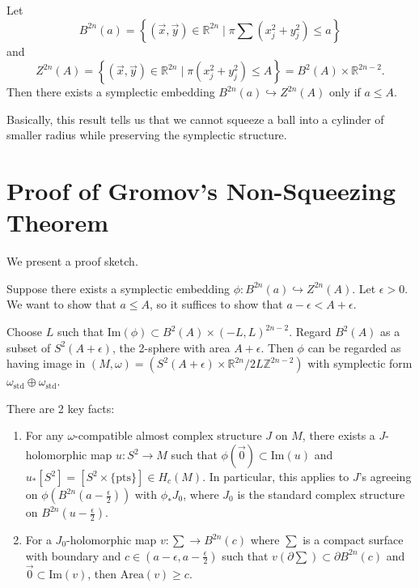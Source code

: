 \begin{theorem}

Let
\[
B^{2n}(a) = \left\{ (\vec{x}, \vec{y}) \in \mathbb{R}^{2n} \mid  \pi \sum (x_j^2+y_j^2) \le a\right\}
\]
and
\[
Z^{2n}(A) = \left\{ (\vec{x}, \vec{y}) \in \mathbb{R}^{2n} \mid  \pi(x_j^2+y_j^2) \le A \right\}=B^2(A) \times \mathbb{R}^{2n-2}.
\]
Then there exists a symplectic embedding $B^{2n}(a) \hookrightarrow Z^{2n}(A)$ only if $a\le A$.

\end{theorem}

Basically, this result tells us that we cannot squeeze a ball into a cylinder of smaller radius while preserving the symplectic structure.

\section{Proof of Gromov's Non-Squeezing Theorem}

We present a proof sketch.

Suppose there exists a symplectic embedding $\phi: B^{2n}(a) \hookrightarrow Z^{2n}(A)$. Let $\epsilon >0$. We want to show that $a\le A$, so it suffices to show that $a-\epsilon < A+\epsilon$.

Choose $L$ such that $\text{Im}(\phi) \subset B^2(A)\times (-L,L)^{2n-2}$. Regard $B^2(A)$ as a subset of $S^2(A+\epsilon)$, the 2-sphere with area $A+\epsilon$. Then $\phi$ can be regarded as having image in $(M, \omega)=(S^2(A+\epsilon)\times \mathbb{R}^{2n}/2L\mathbb{Z}^{2n-2})$ with symplectic form $\omega_{\text{std}}\oplus \omega_{\text{std}}$.

There are 2 key facts:

\begin{enumerate}
\item For any $\omega$-compatible almost complex structure $J$ on $M$, there exists a $J$-holomorphic map $u:S^2 \to M$ such that $\phi\left(\vec{0}\right)\subset \text{Im}(u)$ and $u_*[S^2]=[S^2\times \{\text{pts}\}] \in H_c(M)$. In particular, this applies to $J$'s agreeing on $\phi(B^{2n}(a-\frac{\epsilon}{2}))$ with $\phi_*J_0$, where $J_0$ is the standard complex structure on $B^{2n}(u-\frac{\epsilon}{2})$.
\item For a $J_0$-holomorphic map $v: \sum \to B^{2n}(c)$ where $\sum$ is a compact surface with boundary and $c \in (a - \epsilon, a - \frac{\epsilon}{2})$ such that $v(\partial \sum) \subset \partial B^{2n}(c)$ and $\vec{0} \subset \text{Im}(v)$, then $\text{Area}(v) \ge c$.
\end{enumerate}

